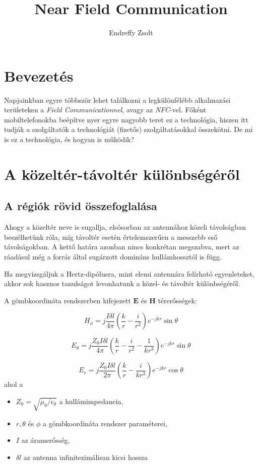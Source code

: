\documentclass[12pt]{article}
\author{Endreffy Zsolt}
\title{Near Field Communication}
\begin{document}
\maketitle

\pagebreak

\tableofcontents

\pagebreak

\section{Bevezetés}
Napjainkban egyre többször lehet találkozni a legkülönfélébb alkalmazási 
területeken a \emph{Field Communicationnel}, avagy az \emph{NFC}-vel.
Főként mobiltelefonokba beépítve nyer egyre nagyobb teret ez a technológia,
hiszen itt tudják a szolgáltatók a technológiát (fizetős) szolgáltatásokkal
összekötni.
De mi is ez a technológia, és hogyan is működik?

\section{A közeltér-távoltér különbségéről}

\subsection{A régiók rövid összefoglalása}
Ahogy a közeltér neve is sugallja, elsősorban az antennához közeli távolságban
beszélhetünk róla, míg távoltér esetén értelemszerűen a messzebb eső 
távolságokban. A kettő határa azonban nincs konkrétan megszabva, mert az
ráadásul még a forrás által sugárzott domináns hullámhossztól is függ.

Ha megvizsgáljuk a Hertz-dipólusra, mint elemi antennára felírható egyenleteket,
akkor sok hasznos tanulságot levonhatunk a közel- és távoltér különbségéről.

A gömbkoordináta rendszerben kifejezett $\mathbf{E}$ és $\mathbf{H}$ térerősségek:

\begin{equation}
H_{\phi} = j \frac{I \delta l}{4 \pi}
\left( \frac{k}{r} - \frac{i}{r^2} \right)
e^{-jkr} \sin \theta
\end{equation}

\begin{equation}
E_{\theta} = j \frac{Z_0 I \delta l}{4 \pi}
\left( \frac{k}{r} - \frac{i}{r^2} -\frac{1}{kr^3}\right)
e^{-jkr} \sin \theta
\end{equation}

\begin{equation}
E_{r} = j \frac{Z_0 I \delta l}{2 \pi}
\left( \frac{k}{r} - \frac{i}{kr^3}\right)
e^{-jkr} \cos \theta
\end{equation}
ahol a 
\begin{itemize}
\item $Z_0 = \sqrt{{\mu_0}/{\epsilon_0}}$ a hullámimpedancia,
\item $r, \theta$ és  $\phi$ a gömbkoordináta rendszer paraméterei,
\item $I$ az áramerősség,
\item $\delta l$ az antenna infinitezimálisan kicsi hossza
\end{itemize} 
\end{document}
